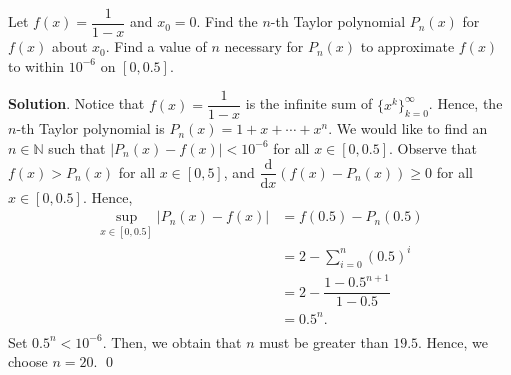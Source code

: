 \documentclass[11pt]{article}
\theoremstyle{break}
\newcommand{\dd}{\text{d}}
\numberwithin{equation}{theorem}
\begin{document}
\begin{problem}\label{problem 4}
    Let $f(x)=\dfrac{1}{1-x}$ and $x_0=0$. Find the $n$-th Taylor polynomial $P_n(x)$ for $f(x)$ about $x_0$. Find a value of $n$ necessary for $P_n(x)$ to approximate $f(x)$ to within $10^{-6}$ on $[0, 0.5]$.
\end{problem}
\textbf{Solution}. Notice that $f(x)=\dfrac{1}{1-x}$ is the infinite sum of $\{x^k\}_{k=0}^\infty$. Hence, the $n$-th Taylor polynomial is $\displaystyle P_n(x)=1+x+\cdots+x^n$. We would like to find an $n\in\mathbb{N}$ such that $|P_n(x)-f(x)|<10^{-6}$ for all $x\in[0, 0.5]$. Observe that $f(x)>P_n(x)$ for all $x\in[0, 5]$, and $\dfrac{\dd}{\dd x}\left(f(x)-P_n(x)\right)\geq 0$ for all $x\in[0, 0.5]$. Hence, \vspace{-0.6em}
\begin{align*}
    \sup_{x\in[0, 0.5]}|P_n(x)-f(x)|&=f(0.5)-P_n(0.5)\\
    &=2-\sum_{i=0}^{n}(0.5)^i\\
    &=2-\dfrac{1-0.5^{n+1}}{1-0.5}\\
    &=0.5^n.\\[-3.4em]
\end{align*}
Set $0.5^n<10^{-6}$. Then, we obtain that $n$ must be greater than $19.5$. Hence, we choose $n=20$. \qed
\end{document}
